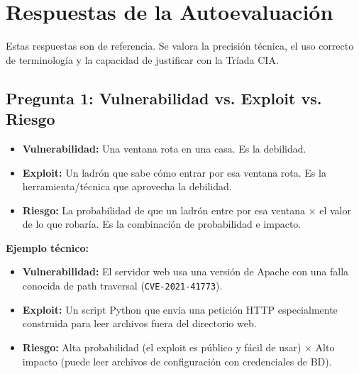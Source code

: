 \documentclass[11pt,a4paper]{article}
\begin{document}
\section{Respuestas de la Autoevaluación}\label{sec:respuestas}

\begin{clave}
Estas respuestas son de referencia. Se valora la precisión técnica, el uso correcto de terminología y la capacidad de justificar con la Tríada CIA.
\end{clave}

\subsection*{Pregunta 1: Vulnerabilidad vs. Exploit vs. Riesgo}
\begin{respuesta}
\begin{itemize}[leftmargin=*]
  \item \textbf{Vulnerabilidad:} Una ventana rota en una casa. Es la debilidad.
  \item \textbf{Exploit:} Un ladrón que sabe cómo entrar por esa ventana rota. Es la herramienta/técnica que aprovecha la debilidad.
  \item \textbf{Riesgo:} La probabilidad de que un ladrón entre por esa ventana $\times$ el valor de lo que robaría. Es la combinación de probabilidad e impacto.
\end{itemize}

\textbf{Ejemplo técnico:}
\begin{itemize}[leftmargin=*]
  \item \textbf{Vulnerabilidad:} El servidor web usa una versión de Apache con una falla conocida de path traversal (\texttt{CVE-2021-41773}).
  \item \textbf{Exploit:} Un script Python que envía una petición HTTP especialmente construida para leer archivos fuera del directorio web.
  \item \textbf{Riesgo:} Alta probabilidad (el exploit es público y fácil de usar) $\times$ Alto impacto (puede leer archivos de configuración con credenciales de BD).
\end{itemize}
\end{respuesta}
\end{document}
